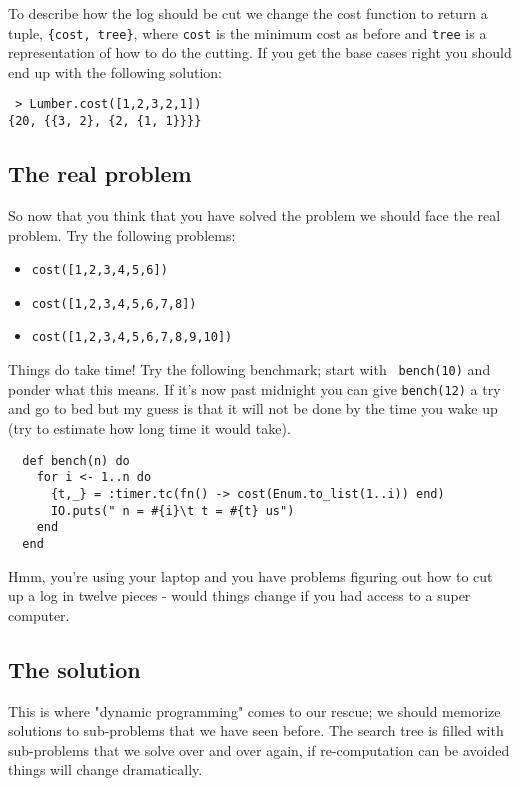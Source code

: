 \documentclass[a4paper,11pt]{article}
\begin{document}
 To describe how the log should be cut we change the cost function to
 return a tuple, {\tt \{cost, tree\}}, where {\tt cost} is the minimum
 cost as before and {\tt tree} is a representation of how to do the
 cutting. If you get the base cases right you should end up with the
 following solution:
 
\begin{verbatim}
 > Lumber.cost([1,2,3,2,1])
{20, {{3, 2}, {2, {1, 1}}}}
\end{verbatim}

\subsection*{The real problem}

So now that you think that you have solved the problem we should face
the real problem. Try the following problems:

\begin{itemize}
\item {\tt cost([1,2,3,4,5,6])}
\item {\tt cost([1,2,3,4,5,6,7,8])}
\item {\tt cost([1,2,3,4,5,6,7,8,9,10])} 
\end{itemize}

Things do take time! Try the following benchmark; start with {\tt
  bench(10)} and ponder what this means. If it's now past midnight you
can give {\tt bench(12)} a try and go to bed but my guess is that it
will not be done by the time you wake up (try to estimate how long
time it would take).

\begin{verbatim}
  def bench(n) do
    for i <- 1..n do
      {t,_} = :timer.tc(fn() -> cost(Enum.to_list(1..i)) end)
      IO.puts(" n = #{i}\t t = #{t} us")
    end
  end
\end{verbatim}

Hmm, you're using your laptop and you have problems figuring out how
to cut up a log in twelve pieces - would things change if you had
access to a super computer.


\subsection*{The solution}

This is where "dynamic programming" comes to our rescue; we should
memorize solutions to sub-problems that we have seen before. The search
tree is filled with sub-problems that we solve over and over again, if
re-computation can be avoided things will change dramatically.
\end{document}
